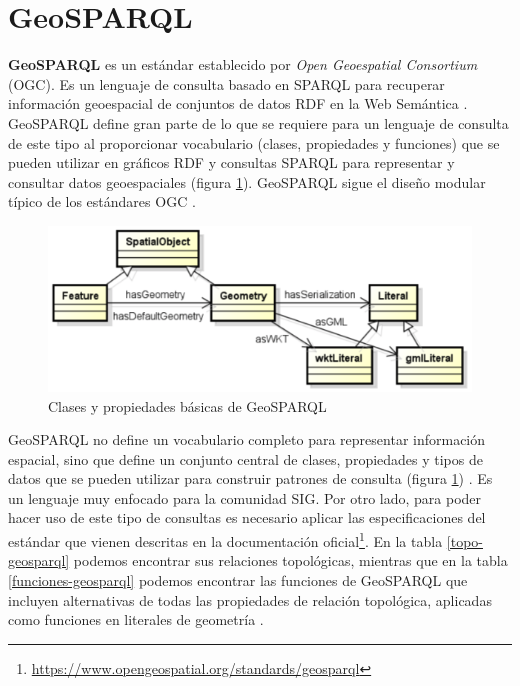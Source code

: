 \section{GeoSPARQL}
\label{ch:capitulo4-geosparql}

\textbf{GeoSPARQL} es un estándar establecido por \textit{Open Geoespatial Consortium} (OGC). Es un lenguaje de consulta basado en SPARQL para recuperar información geoespacial de conjuntos de datos RDF en la Web Semántica \cite{libro-gis}. GeoSPARQL define gran parte de lo que se requiere para un lenguaje de consulta de este tipo al proporcionar vocabulario (clases, propiedades y funciones) que se pueden utilizar en gráficos RDF y consultas SPARQL para representar y consultar datos geoespaciales (figura \ref{fig:geosparql}). GeoSPARQL sigue el diseño modular típico de los estándares OGC \cite{ogc-geo, wkt-database}.


\begin{figure}[H]
	\centering
	\includegraphics[width=1\linewidth]{imagenes/capitulo3/geosparql}
	\caption{Clases y propiedades básicas de GeoSPARQL \cite{tesis-otro}}
	\label{fig:geosparql}
\end{figure}

GeoSPARQL no define un vocabulario completo para representar información espacial, sino que define un conjunto central de clases, propiedades y tipos de datos que se pueden utilizar para construir patrones de consulta (figura \ref{fig:geosparql}) \cite{ogc-geo}. Es un lenguaje muy enfocado para la comunidad SIG. Por otro lado, para poder hacer uso de este tipo de consultas es necesario aplicar las especificaciones del estándar que vienen descritas en la documentación oficial\footnote{\url{https://www.opengeospatial.org/standards/geosparql}}. En la tabla \ref{topo-geosparql} podemos encontrar sus relaciones topológicas, mientras que en la tabla \ref{funciones-geosparql} podemos encontrar las funciones de GeoSPARQL que incluyen alternativas de todas las propiedades de relación topológica, aplicadas como funciones en literales de geometría \cite{tesis-otro}. 

